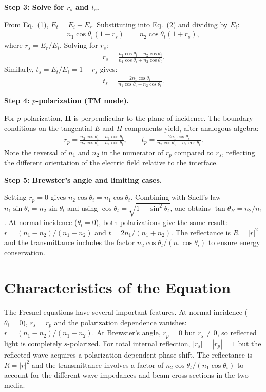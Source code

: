 \documentclass[11pt,openright]{book}
\begin{document}
\textbf{Step 3: Solve for $r_s$ and $t_s$.}

From Eq.\ (1), $E_t = E_i + E_r$. Substituting into Eq.\ (2) and dividing by $E_i$:
\begin{align}
n_1\cos\theta_i(1 - r_s) &= n_2\cos\theta_t(1 + r_s),
\end{align}
where $r_s = E_r/E_i$. Solving for $r_s$:
\begin{align}
r_s = \frac{n_1\cos\theta_i - n_2\cos\theta_t}{n_1\cos\theta_i + n_2\cos\theta_t}.
\end{align}
Similarly, $t_s = E_t/E_i = 1 + r_s$ gives:
\begin{align}
t_s = \frac{2n_1\cos\theta_i}{n_1\cos\theta_i + n_2\cos\theta_t}.
\end{align}

\textbf{Step 4: $p$-polarization (TM mode).}

For $p$-polarization, $\mathbf{H}$ is perpendicular to the plane of incidence. The boundary conditions on the tangential $E$ and $H$ components yield, after analogous algebra:
\begin{align}
r_p = \frac{n_2\cos\theta_i - n_1\cos\theta_t}{n_2\cos\theta_i + n_1\cos\theta_t}, \qquad t_p = \frac{2n_1\cos\theta_i}{n_2\cos\theta_i + n_1\cos\theta_t}.
\end{align}
Note the reversal of $n_1$ and $n_2$ in the numerator of $r_p$ compared to $r_s$, reflecting the different orientation of the electric field relative to the interface.

\textbf{Step 5: Brewster's angle and limiting cases.}

Setting $r_p = 0$ gives $n_2\cos\theta_i = n_1\cos\theta_t$. Combining with Snell's law $n_1\sin\theta_i = n_2\sin\theta_t$ and using $\cos\theta_t = \sqrt{1 - \sin^2\theta_t}$, one obtains $\tan\theta_B = n_2/n_1$. At normal incidence ($\theta_i = 0$), both polarizations give the same result: $r = (n_1 - n_2)/(n_1 + n_2)$ and $t = 2n_1/(n_1 + n_2)$. The reflectance is $R = |r|^2$ and the transmittance includes the factor $n_2\cos\theta_t/(n_1\cos\theta_i)$ to ensure energy conservation.

\section*{Characteristics of the Equation}

The Fresnel equations have several important features. At normal incidence ($\theta_i = 0$), $r_s = r_p$ and the polarization dependence vanishes: $r = (n_1 - n_2)/(n_1 + n_2)$. At Brewster's angle, $r_p = 0$ but $r_s \neq 0$, so reflected light is completely $s$-polarized. For total internal reflection, $|r_s| = |r_p| = 1$ but the reflected wave acquires a polarization-dependent phase shift. The reflectance is $R = |r|^2$ and the transmittance involves a factor of $n_2\cos\theta_t/(n_1\cos\theta_i)$ to account for the different wave impedances and beam cross-sections in the two media.
\end{document}
